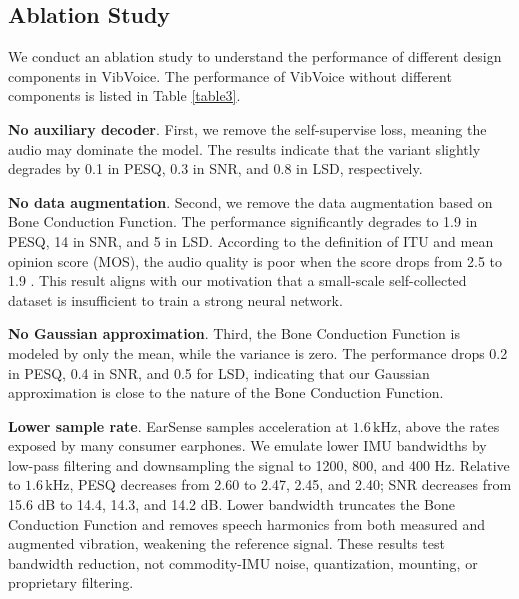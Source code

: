\subsection{Ablation Study}
We conduct an ablation study to understand the performance of different design components in VibVoice. The performance of VibVoice without different components is listed in Table \ref{table3}.

\noindent\textbf{No auxiliary decoder}. First, we remove the self-supervise loss, meaning the audio may dominate the model. The results indicate that the variant slightly degrades by 0.1 in PESQ, 0.3 in SNR, and 0.8 in LSD, respectively.

\noindent\textbf{No data augmentation}.
Second, we remove the data augmentation based on Bone Conduction Function. The performance significantly degrades to 1.9 in PESQ, 14 in SNR, and 5 in LSD. According to the definition of ITU and mean opinion score (MOS), the audio quality is poor when the score drops from 2.5 to 1.9 \citep{Perceptu66:online}. This result aligns with our motivation that a small-scale self-collected dataset is insufficient to train a strong neural network.

\noindent\textbf{No Gaussian approximation}.
Third, the Bone Conduction Function is modeled by only the mean, while the variance is zero. The performance drops 0.2 in PESQ, 0.4 in SNR, and 0.5 for LSD, indicating that our Gaussian approximation is close to the nature of the Bone Conduction Function.

\noindent\textbf{Lower sample rate}.
EarSense samples acceleration at $1.6\,\text{kHz}$, above the rates exposed by many consumer earphones. We emulate lower IMU bandwidths by low-pass filtering and downsampling the signal to 1200, 800, and 400 Hz. Relative to $1.6\,\text{kHz}$, PESQ decreases from 2.60 to 2.47, 2.45, and 2.40; SNR decreases from 15.6 dB to 14.4, 14.3, and 14.2 dB. Lower bandwidth truncates the Bone Conduction Function and removes speech harmonics from both measured and augmented vibration, weakening the reference signal. These results test bandwidth reduction, not commodity-IMU noise, quantization, mounting, or proprietary filtering.

